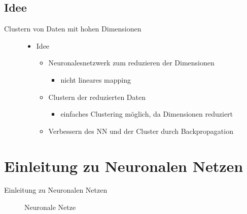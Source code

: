 \documentclass{beamer}
\begin{document}
\subsection{Idee}
\begin{frame}[t]{Clustern von Daten mit hohen Dimensionen}\vspace{40pt}
\begin{figure}
\center
\LARGE{
\begin{itemize}
\item Idee
\begin{itemize}
\item Neuronalesnetzwerk zum reduzieren der Dimensionen
\begin{itemize}
\item nicht lineares mapping
\end{itemize}
\item Clustern der reduzierten Daten
\begin{itemize}
\item einfaches Clustering möglich, da Dimensionen reduziert
\end{itemize}
\item Verbessern des NN und der Cluster durch Backpropagation
\end{itemize}
\end{itemize}
}
\end{figure}

\end{frame}

\section{Einleitung zu Neuronalen Netzen}
\begin{frame}[t]{Einleitung zu Neuronalen Netzen}\vspace{70pt}
\begin{figure}
\center
\Huge{Neuronale Netze}
\end{figure}
\end{frame}
\end{document}

